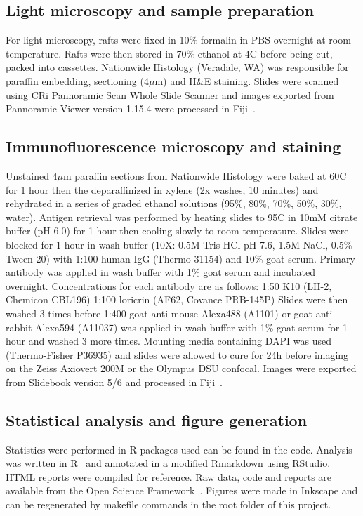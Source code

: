 \documentclass[10pt,letterpaper]{article}
\begin{document}
\subsection*{Light microscopy and sample preparation}
For light microscopy, rafts were fixed in 10\% formalin in PBS overnight at room temperature.
Rafts were then stored in 70\% ethanol at 4\degree C before being cut, packed into cassettes.
Nationwide Histology (Veradale, WA) was responsible for paraffin embedding, sectioning (4$\mu$m) and H\&E staining.
Slides were scanned using CRi Pannoramic Scan Whole Slide Scanner and images exported from Pannoramic Viewer version 1.15.4 were processed in Fiji~\cite{schindelin_fiji:_2012}.

\subsection*{Immunofluorescence microscopy and staining}
Unstained 4$\mu$m paraffin sections from Nationwide Histology were baked at 60\degree C for 1 hour then the deparaffinized in xylene (2x washes, 10 minutes) and rehydrated in a series of graded ethanol solutions (95\%, 80\%, 70\%, 50\%, 30\%, water).
Antigen retrieval was performed by heating slides to 95\degree C in 10mM citrate buffer (pH 6.0) for 1 hour then cooling slowly to room temperature.
Slides were blocked for 1 hour in wash buffer (10X: 0.5M Tris-HCl pH 7.6, 1.5M NaCl, 0.5\% Tween 20) with 1:100 human IgG (Thermo 31154) and 10\% goat serum.
Primary antibody was applied in wash buffer with 1\% goat serum and incubated overnight.
Concentrations for each antibody are as follows:
1:50 K10 (LH-2, Chemicon CBL196)
1:100 loricrin (AF62, Covance PRB-145P)
Slides were then washed 3 times before 1:400 goat anti-mouse Alexa488 (A1101) or goat anti-rabbit Alexa594 (A11037) was applied in wash buffer with 1\% goat serum for 1 hour and washed 3 more times.
Mounting media containing DAPI was used (Thermo-Fisher P36935) and slides were allowed to cure for 24h before imaging on the Zeiss Axiovert 200M or the Olympus DSU confocal.
Images were exported from Slidebook version 5/6 and processed in Fiji~\cite{schindelin_fiji:_2012}.

\subsection*{Statistical analysis and figure generation}
Statistics were performed in R packages used can be found in the code. Analysis was written in R~\cite{r_core_team_r:_2015} and annotated in a modified Rmarkdown using RStudio.
HTML reports were compiled for reference. Raw data, code and reports are available from the Open Science Framework~\cite{chan_organotypic_2016}.
Figures were made in Inkscape and can be regenerated by makefile commands in the root folder of this project.
\end{document}

